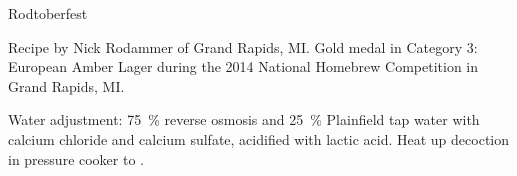 \begin{recipe}{Rodtoberfest}

\begin{aboutblock}
Recipe by Nick Rodammer of Grand Rapids, MI. Gold medal in Category 3: European
Amber Lager during the 2014 National Homebrew Competition in Grand Rapids, MI.
\sourceaha
\end{aboutblock}


\begin{methodandtiming}

\begin{mashsteps}
\end{mashsteps}

\begin{fermentationsteps}
\end{fermentationsteps}

\begin{directions}
Water adjustment: 75~\% reverse osmosis and 25~\% Plainfield tap water with
 calcium chloride and  calcium sulfate, acidified with 
lactic acid. Heat up decoction in pressure cooker to .
\end{directions}

\end{methodandtiming}

\recipebreak

\begin{ingredientsblock}

\begin{malts}
\end{malts}

\begin{hops}
\end{hops}


\end{ingredientsblock}

\end{recipe}
